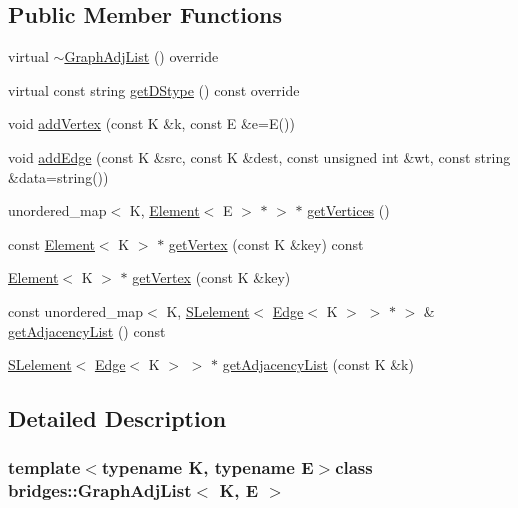\subsection*{Public Member Functions}
\begin{DoxyCompactItemize}
\item 
virtual \hyperlink{classbridges_1_1_graph_adj_list_a72a783f3136b10b5abef0c32364e9ea1}{$\sim$\+Graph\+Adj\+List} () override
\item 
virtual const string \hyperlink{classbridges_1_1_graph_adj_list_a598803ce2292ce3fa23fbd3f37f12176}{get\+D\+Stype} () const  override
\item 
void \hyperlink{classbridges_1_1_graph_adj_list_a8e97b282f1fc28f1ecda90bf3fc38d76}{add\+Vertex} (const K \&k, const E \&e=E())
\item 
void \hyperlink{classbridges_1_1_graph_adj_list_a0e53ad3b952a149e48e785c55ea2d6f6}{add\+Edge} (const K \&src, const K \&dest, const unsigned int \&wt, const string \&data=string())
\item 
unordered\+\_\+map$<$ K, \hyperlink{classbridges_1_1_element}{Element}$<$ E $>$ $\ast$ $>$ $\ast$ \hyperlink{classbridges_1_1_graph_adj_list_a3ccafacee927928486579aa90d8ed49f}{get\+Vertices} ()
\item 
const \hyperlink{classbridges_1_1_element}{Element}$<$ K $>$ $\ast$ \hyperlink{classbridges_1_1_graph_adj_list_a703056af2d7d3707955b7d6932d2db97}{get\+Vertex} (const K \&key) const 
\item 
\hyperlink{classbridges_1_1_element}{Element}$<$ K $>$ $\ast$ \hyperlink{classbridges_1_1_graph_adj_list_af8f9bda32da9089cdf6bc84f1f14493b}{get\+Vertex} (const K \&key)
\item 
const unordered\+\_\+map$<$ K, \hyperlink{classbridges_1_1_s_lelement}{S\+Lelement}$<$ \hyperlink{classbridges_1_1_edge}{Edge}$<$ K $>$ $>$ $\ast$ $>$ \& \hyperlink{classbridges_1_1_graph_adj_list_aa6b4508c108c14b2c254356370b3f8e5}{get\+Adjacency\+List} () const 
\item 
\hyperlink{classbridges_1_1_s_lelement}{S\+Lelement}$<$ \hyperlink{classbridges_1_1_edge}{Edge}$<$ K $>$ $>$ $\ast$ \hyperlink{classbridges_1_1_graph_adj_list_aff1124f9e9cc3d86a44c7cd62bd929b1}{get\+Adjacency\+List} (const K \&k)
\end{DoxyCompactItemize}


\subsection{Detailed Description}
\subsubsection*{template$<$typename K, typename E$>$class bridges\+::\+Graph\+Adj\+List$<$ K, E $>$}

